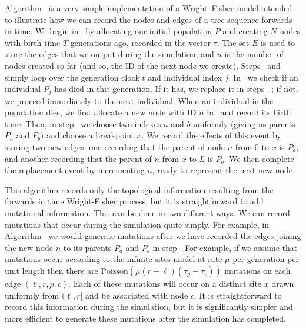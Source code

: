 \documentclass{article}
\begin{document}
Algorithm~ is a very simple implementation of a Wright--Fisher model
intended to illustrate how we can record the nodes and edges of a tree sequence
forwards in time. We begin in~ by allocating our initial population $P$
and creating $N$ nodes with birth time $T$ generations ago, recorded in the
vector $\tau$. The set $E$ is used to store the edges that we output during the
simulation, and $n$ is the number of nodes created so far (and so, the ID of
the next node we create). Steps~ and~ simply loop over
the generation clock $t$ and individual index $j$. In~ we check if
an individual $P_j$ has died in this generation. If it has, we replace it in
steps --; if not, we proceed immediately to the next
individual. When an individual in the population dies, we first allocate
a new node with ID $n$ in~ and record its birth time. Then,
in step~ we choose two indexes $a$ and $b$ uniformly (giving us
parents $P_a$ and $P_b$) and choose a breakpoint $x$. We record the effects of this
event by storing two new edges: one recording that the parent of node $n$
from $0$ to $x$ is $P_a$, and another recording that the parent of $n$
from $x$ to $L$ is $P_b$. We then complete the replacement event by incrementing
$n$, ready to represent the next new node.

This algorithm records only the topological information resulting from the
forwards in time Wright-Fisher process, but it is straightforward to add
mutational information. This can be done in two different ways.
We can record mutations that occur during the simulation quite simply.
For example, in Algorithm~ we would generate mutations after
we have recorded the edges joining the new node $n$ to its parents
$P_a$ and $P_b$ in step .
For example, if we assume that mutations occur according to the infinite sites model
at rate $\mu$ per generation per unit length then there are 
$\mbox{Poisson}\left(\mu (r - \ell)(\tau_p
- \tau_c)\right)$ mutations on each edge $(\ell, r, p, c)$. Each of these mutations
will occur on a distinct site $x$ drawn uniformly from $(\ell, r]$ and be associated with node $c$.
It is straightforward to record this information during the simulation, but it
is significantly simpler and more efficient to generate these mutations
after the simulation has completed. 
\end{document}
